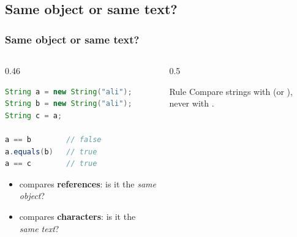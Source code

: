 \documentclass[aspectratio=169,10pt,compress]{beamer}
\begin{document}

\subsection[Same]{Same object or same text?}




\begin{frame}[t,fragile] \frametitle{Same object or same text?}
  \begin{columns}[T]
    \begin{column}{0.46\textwidth}


\begin{lstlisting}[style=codesnippet, language=Java]
String a = new String("ali");
String b = new String("ali");
String c = a;

a == b        // false
a.equals(b)   // true
a == c        // true
\end{lstlisting}


      \begin{itemize}\small
        \item \hCode{==} compares \textbf{references}: is it the \emph{same object}?
        \item {} compares \textbf{characters}: is it the \emph{same text}?
      \end{itemize}
    \end{column}
    \begin{column}{0.5\textwidth}
    
      \begin{center}
      \end{center}
      
      \begin{alertblock}{Rule}
        \small Compare strings with  (or ), 
        never with \hCode{==}.
      \end{alertblock}
    \end{column}
  \end{columns}
\end{frame}
\end{document}
